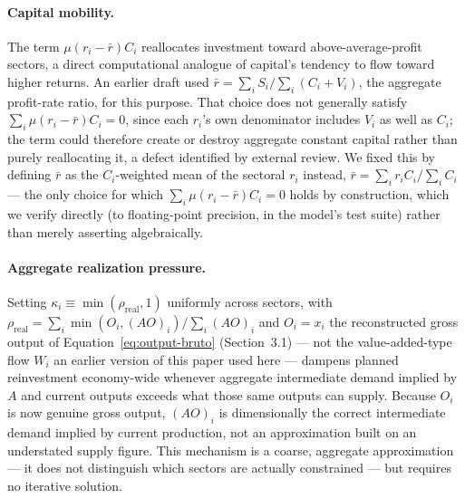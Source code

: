 \documentclass[11pt]{article}
\begin{document}
\paragraph{Capital mobility.} The term $\mu(r_i-\bar r)C_i$ reallocates
investment toward above-average-profit sectors, a direct computational
analogue of capital's tendency to flow toward higher returns. An earlier
draft used $\bar r=\sum_iS_i/\sum_i(C_i+V_i)$, the aggregate profit-rate
ratio, for this purpose. That choice does not generally satisfy
$\sum_i\mu(r_i-\bar r)C_i=0$, since each $r_i$'s own denominator includes
$V_i$ as well as $C_i$; the term could therefore create or destroy
aggregate constant capital rather than purely reallocating it, a defect
identified by external review. We fixed this by defining $\bar r$ as the
$C_i$-weighted mean of the sectoral $r_i$ instead,
$\bar r=\sum_ir_iC_i/\sum_iC_i$ --- the only choice for which
$\sum_i\mu(r_i-\bar r)C_i=0$ holds by construction, which we verify
directly (to floating-point precision, in the model's test suite) rather
than merely asserting algebraically.

\paragraph{Aggregate realization pressure.} Setting $\kappa_i \equiv
\min(\rho_{\text{real}},1)$ uniformly across sectors, with
$\rho_{\text{real}} = \sum_i \min(O_i,(AO)_i) / \sum_i (AO)_i$ and $O_i=x_i$
the reconstructed gross output of Equation~\eqref{eq:output-bruto}
(Section~3.1) --- not the value-added-type flow $W_i$ an earlier version
of this paper used here --- dampens planned reinvestment economy-wide
whenever aggregate intermediate demand implied by $A$ and current outputs
exceeds what those same outputs can supply. Because $O_i$ is now genuine
gross output, $(AO)_i$ is dimensionally the correct intermediate demand
implied by current production, not an approximation built on an
understated supply figure. This mechanism is a coarse,
aggregate approximation --- it does not distinguish which sectors are
actually constrained --- but requires no iterative solution.
\end{document}

